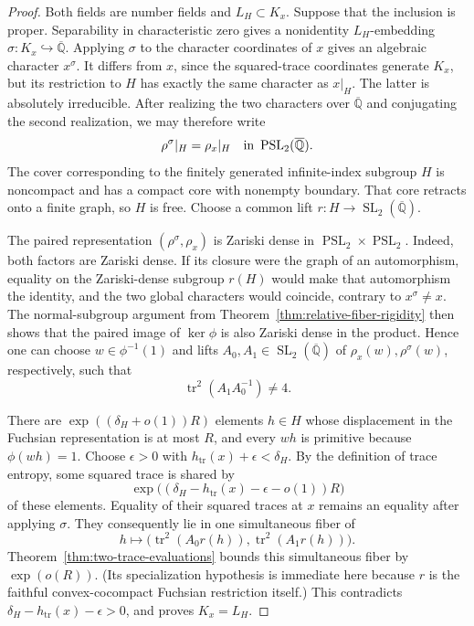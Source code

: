 \documentclass[11pt,reqno]{amsart}
\theoremstyle{definition}
\theoremstyle{remark}
\newcommand{\Q}{\mathbb Q}
\newcommand{\Tr}{\operatorname{tr}}
\newcommand{\SL}{\operatorname{SL}}
\newcommand{\PSL}{\operatorname{PSL}}
\begin{document}
\begin{proof}
Both fields are number fields and \(L_H\subset K_x\).  Suppose that the
inclusion is proper.  Separability in characteristic zero gives a
nonidentity \(L_H\)-embedding
\(\sigma\colon K_x\hookrightarrow\overline{\Q}\).  Applying \(\sigma\) to
the character coordinates of \(x\) gives an algebraic character
\(x^\sigma\).  It differs from \(x\), since the squared-trace coordinates
generate \(K_x\), but its restriction to \(H\) has exactly the same
character as \(x|_H\).  The latter is absolutely irreducible.  After
realizing the two characters over \(\overline{\Q}\) and conjugating the
second realization, we may therefore write
\[
 \rho^\sigma|_H=\rho_x|_H
 \quad\hbox{in }\PSL_2(\overline{\Q}).
\]
The cover corresponding to the finitely generated infinite-index subgroup
\(H\) is noncompact and has a compact core with nonempty boundary.  That
core retracts onto a finite graph, so \(H\) is free.  Choose a common lift
\(r\colon H\to\SL_2(\overline{\Q})\).

The paired representation \((\rho^\sigma,\rho_x)\) is Zariski dense in
\(\PSL_2\times\PSL_2\).  Indeed, both factors are Zariski dense.  If its
closure were the graph of an automorphism, equality on the Zariski-dense
subgroup \(r(H)\) would make that automorphism the identity, and the two
global characters would coincide, contrary to \(x^\sigma\ne x\).  The
normal-subgroup argument from
Theorem~\ref{thm:relative-fiber-rigidity} then shows that the paired image of
\(\ker\phi\) is also Zariski dense in the product.  Hence one can choose
\(w\in\phi^{-1}(1)\) and lifts \(A_0,A_1\in\SL_2(\overline{\Q})\) of
\(\rho_x(w),\rho^\sigma(w)\), respectively, such that
\[
 \Tr^2(A_1A_0^{-1})\ne4.
\]

There are \(\exp((\delta_H+o(1))R)\) elements \(h\in H\) whose displacement
in the Fuchsian representation is at most \(R\), and every \(wh\) is primitive because
\(\phi(wh)=1\).  Choose
\(\epsilon>0\) with
\(h_{\Tr}(x)+\epsilon<\delta_H\).  By the definition of trace entropy,
some squared trace is shared by
\[
 \exp\bigl((\delta_H-h_{\Tr}(x)-\epsilon-o(1))R\bigr)
\]
of these elements.  Equality of their squared traces at \(x\) remains an
equality after applying \(\sigma\).  They consequently lie in one
simultaneous fiber of
\[
 h\longmapsto
 \bigl(\Tr^2(A_0r(h)),\Tr^2(A_1r(h))\bigr).
\]
Theorem~\ref{thm:two-trace-evaluations} bounds this simultaneous fiber by
\(\exp(o(R))\).  (Its specialization hypothesis is immediate here because
\(r\) is the faithful convex-cocompact Fuchsian restriction itself.)  This
contradicts
\(\delta_H-h_{\Tr}(x)-\epsilon>0\), and proves \(K_x=L_H\).
\end{proof}
\end{document}
